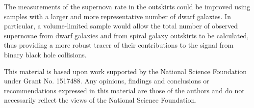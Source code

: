 \documentclass[apj]{emulateapj}
\begin{document}
The measurements of the supernova rate in the outskirts could be improved using samples with a larger and more representative number of dwarf galaxies. In particular, a volume-limited sample would allow the total number of observed supernovae from dwarf galaxies and from spiral galaxy outskirts to be calculated, thus providing a more robust tracer of their contributions to the signal from binary black hole collisions.

This material is based upon work supported by the National Science Foundation under Grant No. 1517488. Any opinions, findings and conclusions or recommendations expressed in this material are those of the authors and do not necessarily reflect the views of the National Science Foundation.
\end{document}

